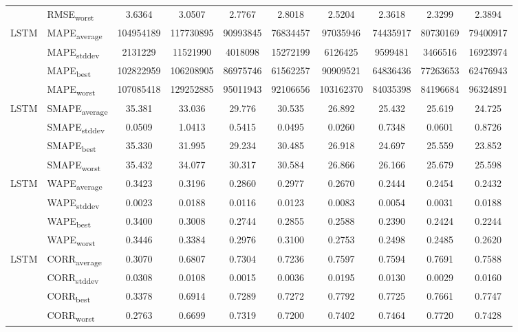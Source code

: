 {\begin{longtable}{l l c c c c c c c c}
 & RMSE\textsubscript{worst} & 3.6364 & 3.0507 & 2.7767 & 2.8018 & 2.5204 & 2.3618 & 2.3299 & 2.3894 \\
\cmidrule(lr){2-10}
\multirow{4}{*}{LSTM} & MAPE\textsubscript{average} & 104954189 & 117730895 & 90993845 & 76834457 & 97035946 & 74435917 & 80730169 & 79400917 \\
 & MAPE\textsubscript{stddev} & 2131229 & 11521990 & 4018098 & 15272199 & 6126425 & 9599481 & 3466516 & 16923974 \\
 & MAPE\textsubscript{best} & 102822959 & 106208905 & 86975746 & 61562257 & 90909521 & 64836436 & 77263653 & 62476943 \\
 & MAPE\textsubscript{worst} & 107085418 & 129252885 & 95011943 & 92106656 & 103162370 & 84035398 & 84196684 & 96324891 \\
\cmidrule(lr){2-10}
\multirow{4}{*}{LSTM} & SMAPE\textsubscript{average} & 35.381 & 33.036 & 29.776 & 30.535 & 26.892 & 25.432 & 25.619 & 24.725 \\
 & SMAPE\textsubscript{stddev} & 0.0509 & 1.0413 & 0.5415 & 0.0495 & 0.0260 & 0.7348 & 0.0601 & 0.8726 \\
 & SMAPE\textsubscript{best} & 35.330 & 31.995 & 29.234 & 30.485 & 26.918 & 24.697 & 25.559 & 23.852 \\
 & SMAPE\textsubscript{worst} & 35.432 & 34.077 & 30.317 & 30.584 & 26.866 & 26.166 & 25.679 & 25.598 \\
\cmidrule(lr){2-10}
\multirow{4}{*}{LSTM} & WAPE\textsubscript{average} & 0.3423 & 0.3196 & 0.2860 & 0.2977 & 0.2670 & 0.2444 & 0.2454 & 0.2432 \\
 & WAPE\textsubscript{stddev} & 0.0023 & 0.0188 & 0.0116 & 0.0123 & 0.0083 & 0.0054 & 0.0031 & 0.0188 \\
 & WAPE\textsubscript{best} & 0.3400 & 0.3008 & 0.2744 & 0.2855 & 0.2588 & 0.2390 & 0.2424 & 0.2244 \\
 & WAPE\textsubscript{worst} & 0.3446 & 0.3384 & 0.2976 & 0.3100 & 0.2753 & 0.2498 & 0.2485 & 0.2620 \\
\cmidrule(lr){2-10}
\multirow{4}{*}{LSTM} & CORR\textsubscript{average} & 0.3070 & 0.6807 & 0.7304 & 0.7236 & 0.7597 & 0.7594 & 0.7691 & 0.7588 \\
 & CORR\textsubscript{stddev} & 0.0308 & 0.0108 & 0.0015 & 0.0036 & 0.0195 & 0.0130 & 0.0029 & 0.0160 \\
 & CORR\textsubscript{best} & 0.3378 & 0.6914 & 0.7289 & 0.7272 & 0.7792 & 0.7725 & 0.7661 & 0.7747 \\
 & CORR\textsubscript{worst} & 0.2763 & 0.6699 & 0.7319 & 0.7200 & 0.7402 & 0.7464 & 0.7720 & 0.7428 \\

\end{longtable}}
